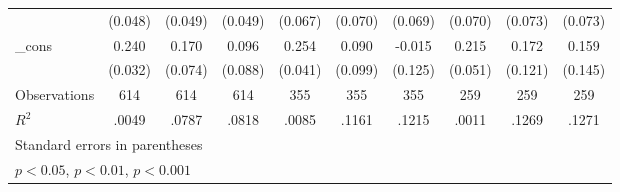 {\begin{tabular}{l*{9}{c}}
            &     (0.048)         &     (0.049)         &     (0.049)         &     (0.067)         &     (0.070)         &     (0.069)         &     (0.070)         &     (0.073)         &     (0.073)         \\
[1em]
\_cons      &       0.240\sym{***}&       0.170\sym{*}  &       0.096         &       0.254\sym{***}&       0.090         &      -0.015         &       0.215\sym{***}&       0.172         &       0.159         \\
            &     (0.032)         &     (0.074)         &     (0.088)         &     (0.041)         &     (0.099)         &     (0.125)         &     (0.051)         &     (0.121)         &     (0.145)         \\
\hline
Observations&         614         &         614         &         614         &         355         &         355         &         355         &         259         &         259         &         259         \\
\(R^{2}\)   &       .0049         &       .0787         &       .0818         &       .0085         &       .1161         &       .1215         &       .0011         &       .1269         &       .1271         \\
\hline\hline
\multicolumn{10}{l}{\footnotesize Standard errors in parentheses}\\
\multicolumn{10}{l}{\footnotesize \sym{*} \(p<0.05\), \sym{**} \(p<0.01\), \sym{***} \(p<0.001\)}\\
\end{tabular}
}
